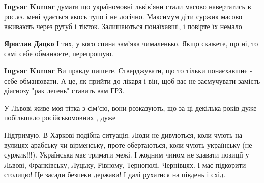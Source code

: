 \begin{itemize}
\begin{itemize}
 
\textbf{Ingvar Kumar} думати що україномовні львів'яни стали масово навертатись в рос.яз. мені здається якось тупо і не логічно. Максимум діти суржик масово вживають через рутуб і тікток. Залишаються понаїхавші, і повірте їх немало

 
\textbf{Ярослав Дацко} І тих, у кого спина зам'яка чималенько. Якщо скажете, що ні, то самі себе обманюєте, перепрошую.

 
\textbf{Ingvar Kumar} Ви правду пишете. Стверджувати, що то тільки понаєхавшиє - себе обманювати. А це, як прийти до лікаря і він, щоб вас не засмучувати замість діагнозу "рак легень" ставить вам ГРЗ.
\end{itemize}

 
У Львові живе моя тітка з сім’єю, вони розказують, що за ці декілька років дуже побільшало російськомовних , дуже

 

Підтримую. В Харкові подібна ситуація. Люди не дивуються, коли чують на вулицях
арабську чи вірменську, проте обертаються, коли чують українську (не
суржик!!!). Українська має тримати межі. І жодним чином не здавати позиції у
Львові, Франківську, Луцьку, Рівному, Тернополі, Чернівцях. І має підкорити
столицю! Це засади безпеки держави! І далі рухатися на південь і схід.


\end{itemize}
